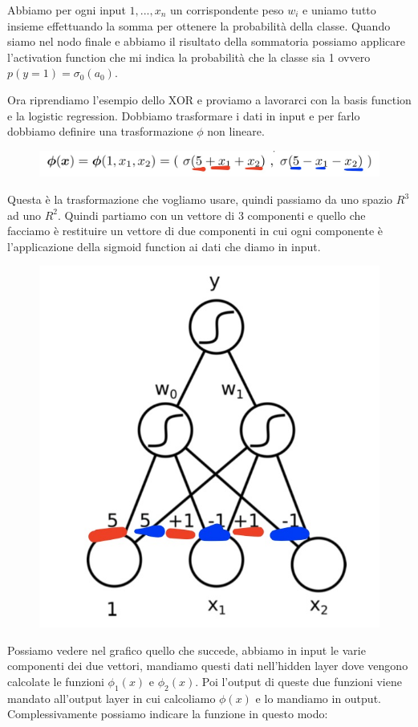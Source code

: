 \documentclass[14pt]{extreport}
\begin{document}
Abbiamo per ogni input $1,...,x_n$ un corrispondente peso $w_i$ e uniamo tutto insieme effettuando la somma per ottenere la probabilità della classe.
Quando siamo nel nodo finale e abbiamo il risultato della sommatoria possiamo applicare l'activation function che mi indica la probabilità che la
classe sia 1 ovvero $p(y=1)=\sigma_0(a_0)$.

Ora riprendiamo l'esempio dello XOR e proviamo a lavorarci con la basis function e la logistic regression. Dobbiamo trasformare i dati in input e per
farlo dobbiamo definire una trasformazione $\phi$ non lineare.

\begin{figure}[H]
\centering
\includegraphics[width=0.7\linewidth]{360.jpeg}
\end{figure}

Questa è la trasformazione che vogliamo usare, quindi passiamo da uno spazio $R^3$ ad uno $R^2$. Quindi partiamo con un vettore di 3 componenti e
quello che facciamo è restituire un vettore di due componenti in cui ogni componente è l'applicazione della sigmoid function ai dati che diamo in
input.

\begin{figure}[H]
\centering
\includegraphics[width=0.5\linewidth]{361.jpeg}
\end{figure}

Possiamo vedere nel grafico quello che succede, abbiamo in input le varie componenti dei due vettori, mandiamo questi dati nell'hidden layer dove
vengono calcolate le funzioni $\phi_1(x)$ e $\phi_2(x)$. Poi l'output di queste due funzioni viene mandato all'output layer in cui calcoliamo
$\phi(x)$ e lo mandiamo in output. Complessivamente possiamo indicare la funzione in questo modo:
\end{document}
